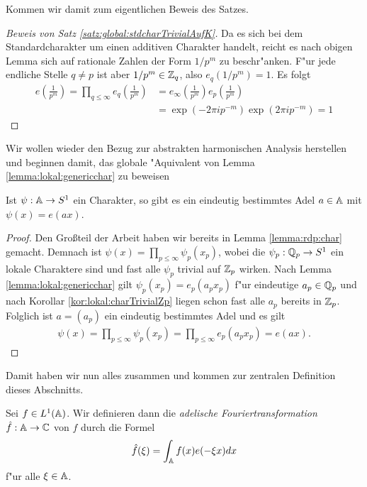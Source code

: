 	Kommen wir damit zum eigentlichen Beweis des Satzes.
	\begin{proof}[Beweis von Satz \ref{satz:global:stdcharTrivialAufK}] 
		Da es sich bei dem Standardcharakter um einen additiven Charakter handelt, reicht es nach obigen Lemma sich auf rationale Zahlen der Form $1/p^m$ zu beschr"anken.
		F"ur jede endliche Stelle $q\not=p$ ist aber $1/p^m \in \mathbb{Z}_q$, also $e_q(1/p^m) =1$.
		Es folgt
		\begin{align*}
			e\left( \frac{1}{p^m} \right) 	= \prod_{q\leq \infty} e_q\left( \frac{1}{p^m} \right) 
											&= e_\infty \left( \frac{1}{p^m} \right) e_p\left( \frac{1}{p^m} \right)\\
											&= \exp(-2\pi i p^{-m}) \exp(2\pi i p^{-m}) = 1
		\end{align*}
	\end{proof}
	Wir wollen wieder den Bezug zur abstrakten harmonischen Analysis herstellen und beginnen damit, das globale "Aquivalent von Lemma \ref{lemma:lokal:genericchar} zu beweisen
	\begin{lemma}
		Ist $\psi: \mathbb{A} \to S^1$ ein Charakter, so gibt es ein eindeutig bestimmtes Adel $a\in\mathbb{A}$ mit $\psi(x) = e(ax)$.
	\end{lemma}
	\begin{proof}
		Den Großteil der Arbeit haben wir bereits in Lemma \ref{lemma:rdp:char} gemacht. 
		Demnach ist $\psi(x) = \prod_{p\leq\infty} \psi_p (x_p)$, wobei die $\psi_p: {\mathbb{Q}_p} \to S^1$ ein lokale Charaktere sind und fast alle $\psi_p$ trivial auf ${\mathbb{Z}_p}$ wirken.
		Nach Lemma \ref{lemma:lokal:genericchar} gilt $\psi_p (x_p) = e_p(a_p x_p)$ f"ur eindeutige $a_p \in {\mathbb{Q}_p}$ und nach Korollar \ref{kor:lokal:charTrivialZp} liegen schon fast alle $a_p$ bereits in ${\mathbb{Z}_p}$.
		Folglich ist $a = (a_p)$ ein eindeutig bestimmtes Adel und es gilt
		\begin{align*}
			\psi(x) = \prod_{p\leq\infty} \psi_p (x_p) = \prod_{p\leq\infty} e_p (a_px_p) = e(ax).
		\end{align*}
	\end{proof}
	Damit haben wir nun alles zusammen und kommen zur zentralen Definition dieses Abschnitts.
	\begin{defi}
		Sei $f\in L^1(\mathbb{A})$. Wir definieren dann die \emph{adelische Fouriertransformation} $\hat{f}: \mathbb{A} \to \mathbb{C}$ von $f$ durch die Formel
	\begin{align*}
		\hat{f}(\xi) = \int_{\mathbb{A}} f(x)e(-\xi x)  d{x}
	\end{align*}
	f"ur alle $\xi \in \mathbb{A}$.
	\end{defi}
	
